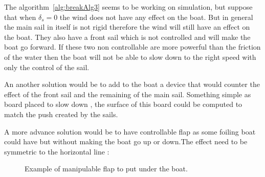 The algorithm~\ref{alg:breakAlg3} seems to be working on simulation, but suppose that when $\delta_s = 0$ the wind does not have any effect on the boat. But in general the main sail in itself is not rigid therefore the wind will still have an effect on the boat. They also have a front sail which is not controlled and will make the boat go forward. If these two non controllable are more powerful than the friction of the water then the boat will not be able to slow down to the right speed with only the control of the sail.


An another solution would be to add to the boat a device that would counter the effect of the front sail and the remaining of the main sail. Something simple as board placed to slow down , the surface of this board could be computed to match the push created by the sails.
 
A more advance solution would be to have controllable flap as some foiling boat could have but without  making the boat go up or down.The effect need to be symmetric to the horizontal line :

\begin{figure}[H]
\centering
{} %
{

}
\caption*{Example of manipulable flap to put under the boat.}
\label{fig:model_boat_}
\end{figure}

